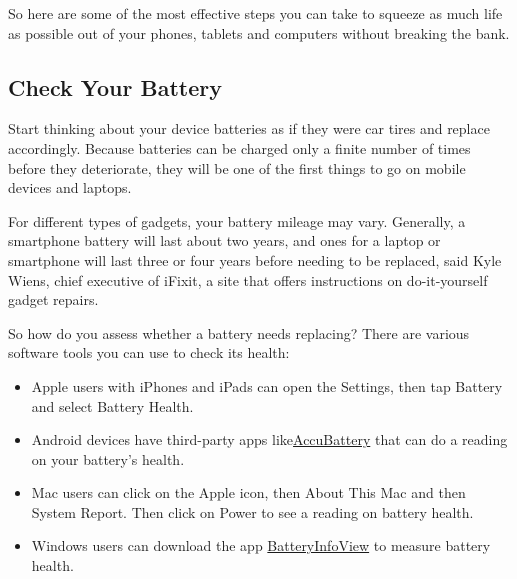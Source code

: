 So here are some of the most effective steps you can take to squeeze as
much life as possible out of your phones, tablets and computers without
breaking the bank.

\hypertarget{check-your-battery}{%
\subsection{Check Your Battery}\label{check-your-battery}}

Start thinking about your device batteries as if they were car tires and
replace accordingly. Because batteries can be charged only a finite
number of times before they deteriorate, they will be one of the first
things to go on mobile devices and laptops.

For different types of gadgets, your battery mileage may vary.
Generally, a smartphone battery will last about two years, and ones for
a laptop or smartphone will last three or four years before needing to
be replaced, said Kyle Wiens, chief executive of iFixit, a site that
offers instructions on do-it-yourself gadget repairs.

So how do you assess whether a battery needs replacing? There are
various software tools you can use to check its health:

\begin{itemize}
\item
  Apple users with iPhones and iPads can open the Settings, then tap
  Battery and select Battery Health.
\item
  Android devices have third-party apps
  like\href{https://nl.nytimes3xbfgragh.onion/f/a/CnFx0v5P5lLYaOrA5NfJ6A~~/AAAAAQA~/RgRf-f_rP0T3aHR0cHM6Ly9wbGF5Lmdvb2dsZS5jb20vc3RvcmUvYXBwcy9kZXRhaWxzP2lkPWNvbS5kaWdpYml0ZXMuYWNjdWJhdHRlcnkmaGw9ZW5fVVMmdGU9MSZubD1wZXJzb25hbC10ZWNoJmVtYz1lZGl0X2N0XzIwMjAwMTA5P2NhbXBhaWduX2lkPTM4Jmluc3RhbmNlX2lkPTE1MDY0JnNlZ21lbnRfaWQ9MjAxODUmdXNlcl9pZD1mODgyNmUzMGY2Mzg1OThjMzAwZWIwODczMTQ5ZDI5NiZyZWdpX2lkPTY1MjU0MTc0ZWRpdF9jdF8yMDIwMDEwOVcDbnl0QgoAKut6F16kiLoqUhZicmlhbi5jaGVuQG55dGltZXMuY29tWAQAAAAA}{AccuBattery}
  that can do a reading on your battery's health.
\item
  Mac users can click on the Apple icon, then About This Mac and then
  System Report. Then click on Power to see a reading on battery health.
\item
  Windows users can download the app
  \href{https://www.nirsoft.net/utils/battery_information_view.html}{BatteryInfoView}
  to measure battery health.
\end{itemize}

